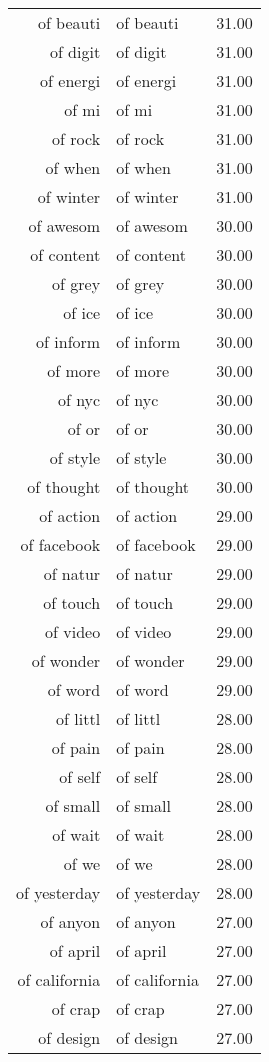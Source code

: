 \begin{table}[ht]
\begin{tabular}{rlr}
  of beauti & of beauti & 31.00 \\ 
  of digit & of digit & 31.00 \\ 
  of energi & of energi & 31.00 \\ 
  of mi & of mi & 31.00 \\ 
  of rock & of rock & 31.00 \\ 
  of when & of when & 31.00 \\ 
  of winter & of winter & 31.00 \\ 
  of awesom & of awesom & 30.00 \\ 
  of content & of content & 30.00 \\ 
  of grey & of grey & 30.00 \\ 
  of ice & of ice & 30.00 \\ 
  of inform & of inform & 30.00 \\ 
  of more & of more & 30.00 \\ 
  of nyc & of nyc & 30.00 \\ 
  of or & of or & 30.00 \\ 
  of style & of style & 30.00 \\ 
  of thought & of thought & 30.00 \\ 
  of action & of action & 29.00 \\ 
  of facebook & of facebook & 29.00 \\ 
  of natur & of natur & 29.00 \\ 
  of touch & of touch & 29.00 \\ 
  of video & of video & 29.00 \\ 
  of wonder & of wonder & 29.00 \\ 
  of word & of word & 29.00 \\ 
  of littl & of littl & 28.00 \\ 
  of pain & of pain & 28.00 \\ 
  of self & of self & 28.00 \\ 
  of small & of small & 28.00 \\ 
  of wait & of wait & 28.00 \\ 
  of we & of we & 28.00 \\ 
  of yesterday & of yesterday & 28.00 \\ 
  of anyon & of anyon & 27.00 \\ 
  of april & of april & 27.00 \\ 
  of california & of california & 27.00 \\ 
  of crap & of crap & 27.00 \\ 
  of design & of design & 27.00 \\ 

\end{tabular}
\end{table}
